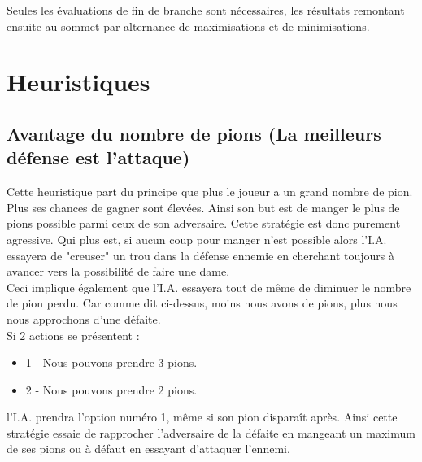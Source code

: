 \documentclass[10pt,a4paper]{report}
\begin{document}
Seules les évaluations de fin de branche sont nécessaires, les résultats remontant ensuite au sommet par alternance de maximisations et de minimisations.

\section{Heuristiques}

	\subsection{Avantage du nombre de pions (La meilleurs défense est l'attaque) }
	
	Cette heuristique part du principe que plus le joueur a un grand nombre de pion. Plus ses chances de gagner sont élevées. Ainsi son but est de manger le plus de pions possible parmi ceux de son adversaire.
	Cette stratégie est donc purement agressive. Qui plus est, si aucun coup pour manger n'est possible alors l'I.A. essayera de "creuser" un trou dans la défense ennemie en cherchant toujours à avancer vers la possibilité de faire une dame. \\
	
	Ceci implique également que l'I.A. essayera tout de même de diminuer le nombre de pion perdu.
	Car comme dit ci-dessus, moins nous avons de pions, plus nous nous approchons d'une défaite. \\
	
	Si 2 actions se présentent : 
	\begin{itemize}
		\item 1 - Nous pouvons prendre 3 pions.
		\item 2 - Nous pouvons prendre 2 pions.
	\end{itemize}
	l'I.A. prendra l'option numéro 1, même si son pion disparaît après.
	Ainsi cette stratégie essaie de rapprocher l'adversaire de la défaite en mangeant un maximum de ses pions ou à défaut en essayant d'attaquer l'ennemi.
\end{document}
